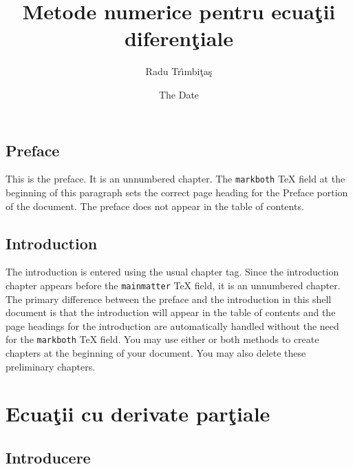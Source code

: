 \documentclass{book}%
\begin{document}
\frontmatter
\title{Metode numerice pentru ecua\c{t}ii diferen\c{t}iale}
\author{Radu Tr\^{\i}mbi\c{t}a\c{s}}
\date{The Date}
\maketitle
\tableofcontents

\chapter*{Preface}

This is the preface. It is an unnumbered chapter.
The \verb|markboth| TeX field at the beginning of this paragraph sets the
correct page heading for the Preface portion of the document. The preface does
not appear in the table of contents.

\chapter{Introduction}

The introduction is entered using the usual chapter tag. Since the
introduction chapter appears before the \verb|mainmatter| TeX field, it is an
unnumbered chapter. The primary difference between the preface and the
introduction in this shell document is that the introduction will appear in
the table of contents and the page headings for the introduction are
automatically handled without the need for the \verb|markboth| TeX field. You
may use either or both methods to create chapters at the beginning of your
document. You may also delete these preliminary chapters.

\mainmatter


\part{Ecua\c{t}ii cu derivate par\c{t}iale}

\chapter{Introducere}
\end{document}
